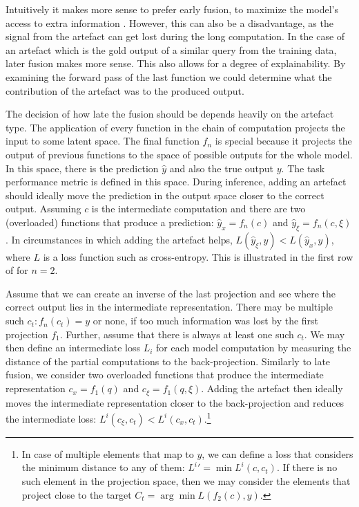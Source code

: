 
Intuitively it makes more sense to prefer early fusion, to maximize the model's access to extra information \citep{izacard2020leveraging, karpukhin2020dense}.
However, this can also be a disadvantage, as the signal from the artefact can get lost during the long computation. In the case of an artefact which is the gold output of a similar query from the training data, later fusion makes more sense. This also allows for a degree of explainability. By examining the forward pass of the last function we could determine what the contribution of the artefact was to the produced output.

The decision of how late the fusion should be depends heavily on the artefact type.
The application of every function in the chain of computation projects the input to some latent space.
The final function $f_n$ is special because it projects the output of previous functions to the space of possible outputs for the whole model.
In this space, there is the prediction $\hat{y}$ and also the true output $y$.
The task performance metric is defined in this space.
During inference, adding an artefact should ideally move the prediction in the output space closer to the correct output.
Assuming $c$ is the intermediate computation and there are two (overloaded) functions that produce a prediction: $\hat{y}_x = f_n(c)$ and $\hat{y}_\xi = f_n(c,\xi)$.
In circumstances in which adding the artefact helps, $L(\hat{y}_\xi, y) < L(\hat{y}_x, y)$, where $L$ is a loss function such as cross-entropy.
This is illustrated in the first row of  for $n = 2$.

Assume that we can create an inverse of the last projection and see where the correct output lies in the intermediate representation.
There may be multiple such $c_t: f_n(c_t) = y$ or none, if too much information was lost by the first projection $f_1$.
Further, assume that there is always at least one such $c_t$.
We may then define an intermediate loss $L_i$ for each model computation by measuring the distance of the partial computations to the back-projection.
Similarly to late fusion, we consider two overloaded functions that produce the intermediate representation $c_x = f_1(q)$ and $c_\xi = f_1(q,\xi)$. 
Adding the artefact then ideally moves the intermediate representation closer to the back-projection and reduces the intermediate loss: $L^i(c_\xi, c_t) < L^i(c_x, c_t)$.\footnote{In case of multiple elements that map to $y$, we can define a loss that considers the minimum distance to any of them: ${L^i}' = \min L^i(c, c_t)$. If there is no such element in the projection space, then we may consider the elements that project close to the target $C_t = \arg \min L(f_2(c),y)$.}

